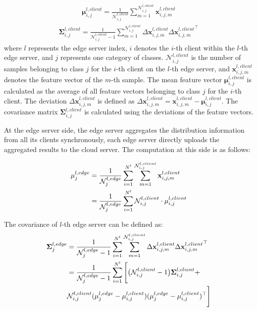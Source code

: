 \documentclass[journal]{IEEEtran}
\begin{document}
\begin{align}
  \label{client mean and covariance}
  \mathbf{\mu}^{l,client}_{i,j} = \frac{1}{\mathcal{N}^{l,client}_{i,j}} 
  \sum_{m=1}^{\mathcal{N}^{l,client}_{i,j}} \mathbf{x}^{l,client}_{i,j,m} 
\end{align}   
\begin{align}
  \mathbf{\Sigma}^{l,client}_{i,j} = \frac{1}{\mathcal{N}^{l,client}_{i,j}-1} 
  \sum_{m=1}^{\mathcal{N}^{l,client}_{i,j}} \Delta \mathbf{x}^{l,client}_{i,j,m} \Delta {\mathbf{x}^{l,client}_{i,j,m}}^\top
\end{align}
where \( l \) represents the edge server index, \( i \) denotes the \( i \)-th client within the \( l \)-th edge server, and \( j \) represents one category of classes. \( \mathcal{N}^{l,client}_{i,j} \) is the number of samples belonging to class \( j \) for the \( i \)-th client on the \( l \)-th edge server, and \( \mathbf{x}^{l,client}_{i,j,m} \) denotes the feature vector of the \( m \)-th sample. The mean feature vector \( \mathbf{\mu}^{l,client}_{i,j} \) is calculated as the average of all feature vectors belonging to class \( j \) for the \( i \)-th client. The deviation \( \Delta \mathbf{x}^{l,client}_{i,j,m} \) is defined as \( \Delta \mathbf{x}^{l,client}_{i,j,m} = \mathbf{x}^{l,client}_{i,j,m} - \mathbf{\mu}^{l,client}_{i,j} \). The covariance matrix \( \mathbf{\Sigma}^{l,client}_{i,j} \) is calculated using the deviations of the feature vectors.

At the edge server side, the edge server aggregates the distribution information from all its clients synchronously, each edge server directly uploads the aggregated results to the cloud server. The computation at this side is as follows:  

\begin{align}
    \label{edge mean}
   \mathbf{\mu}^{l,edge}_{j} &= \frac{1}{\mathcal{N}^{l,edge}_{j}} 
   \sum_{i=1}^{N^l}\sum_{m=1}^{\mathcal{N}^{l,client}_{i,j}} \mathbf{x}^{l,client}_{i,j,m} \notag \\
   &= \frac{1}{\mathcal{N}^{l,edge}_{j}} 
   \sum_{i=1}^{N^l} \mathcal{N}^{l,client}_{i,j} \cdot \mathbf{\mu}^{l,client}_{i,j}
\end{align}

The covariance of \(l\)-th edge server can be defined as:
\begin{align}
    \label{edge covariance}
   \mathbf{\Sigma}^{l,edge}_{j} &= \frac{1}{\mathcal{N}^{l,edge}_{j}-1} \sum_{i=1}^{N^l}
   \sum_{m=1}^{\mathcal{N}^{l,client}_{i,j}} \Delta \mathbf{x}^{l,client}_{i,j,m} \Delta {\mathbf{x}^{l,client}_{i,j,m}}^\top \notag \\
   &= \frac{1}{\mathcal{N}^{l,edge}_{j}-1} \sum_{i=1}^{N^l} \Bigg[
   \big( \mathcal{N}^{l,client}_{i,j}-1\big)\mathbf{\Sigma}^{l,client}_{i,j}+ \notag\\
   & \mathcal{N}^{l,client}_{i,j}(\mathbf{\mu}^{l,edge}_{j}-\mathbf{\mu}^{l,client}_{i,j})(\mathbf{\mu}^{l,edge}_{j}-\mathbf{\mu}^{l,client}_{i,j})^\top\Bigg]
\end{align}
\end{document}
